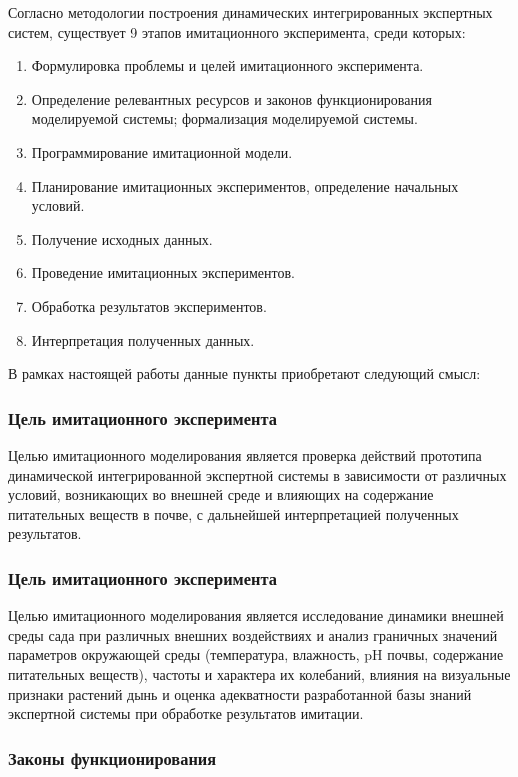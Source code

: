 Согласно методологии построения динамических интегрированных экспертных систем, существует \num{9} этапов имитационного эксперимента, среди которых:
\begin{enumerate}
    \item Формулировка проблемы и целей имитационного эксперимента.
    \item Определение релевантных ресурсов и законов функционирования моделируемой системы; формализация моделируемой системы.
    \item Программирование имитационной модели.
    \item Планирование имитационных экспериментов, определение начальных условий.
    \item Получение исходных данных.
    \item Проведение имитационных экспериментов.
    \item Обработка результатов экспериментов.
    \item Интерпретация полученных данных.
\end{enumerate}

В рамках настоящей работы данные пункты приобретают следующий смысл:

\subsubsection{Цель имитационного эксперимента}

Целью имитационного моделирования является проверка действий прототипа динамической интегрированной экспертной системы в зависимости от различных условий, возникающих во внешней среде и влияющих на содержание питательных веществ в почве, с дальнейшей интерпретацией полученных результатов.

\subsubsection{Цель имитационного эксперимента}

Целью имитационного моделирования является исследование динамики внешней среды сада при различных внешних воздействиях и анализ граничных значений параметров окружающей среды (температура, влажность, pH почвы, содержание питательных веществ), частоты и характера их колебаний, влияния на визуальные признаки растений дынь и оценка адекватности разработанной базы знаний экспертной системы при обработке результатов имитации.


\subsubsection{Законы функционирования}

